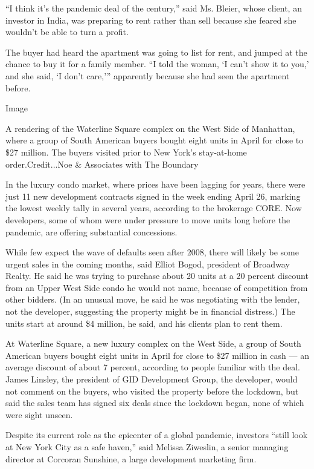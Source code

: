 ``I think it's the pandemic deal of the century,'' said Ms. Bleier,
whose client, an investor in India, was preparing to rent rather than
sell because she feared she wouldn't be able to turn a profit.

The buyer had heard the apartment was going to list for rent, and jumped
at the chance to buy it for a family member. ``I told the woman, `I
can't show it to you,' and she said, `I don't care,''' apparently
because she had seen the apartment before.

Image

A rendering of the Waterline Square complex on the West Side of
Manhattan, where a group of South American buyers bought eight units in
April for close to \$27 million. The buyers visited prior to New York's
stay-at-home order.Credit...Noe \& Associates with The Boundary

In the luxury condo market, where prices have been lagging for years,
there were just 11 new development contracts signed in the week ending
April 26, marking the lowest weekly tally in several years, according to
the brokerage CORE. Now developers, some of whom were under pressure to
move units long before the pandemic, are offering substantial
concessions.

While few expect the wave of defaults seen after 2008, there will likely
be some urgent sales in the coming months, said Elliot Bogod, president
of Broadway Realty. He said he was trying to purchase about 20 units at
a 20 percent discount from an Upper West Side condo he would not name,
because of competition from other bidders. (In an unusual move, he said
he was negotiating with the lender, not the developer, suggesting the
property might be in financial distress.) The units start at around \$4
million, he said, and his clients plan to rent them.

At Waterline Square, a new luxury complex on the West Side, a group of
South American buyers bought eight units in April for close to \$27
million in cash --- an average discount of about 7 percent, according to
people familiar with the deal. James Linsley, the president of GID
Development Group, the developer, would not comment on the buyers, who
visited the property before the lockdown, but said the sales team has
signed six deals since the lockdown began, none of which were sight
unseen.

Despite its current role as the epicenter of a global pandemic,
investors ``still look at New York City as a safe haven,'' said Melissa
Ziweslin, a senior managing director at Corcoran Sunshine, a large
development marketing firm.

